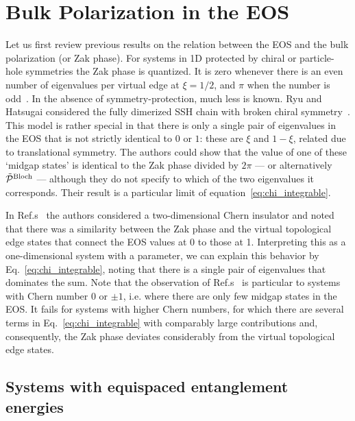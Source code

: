 \documentclass[twocolumn,amsmath,longbibliography,amssymb,superscriptaddress]{revtex4-1}
\begin{document}
\section{Bulk Polarization in the EOS}\label{sec:bulkpolarization}

Let us first review previous results on the relation between the EOS and the bulk polarization (or Zak phase). 
For systems in 1D protected by chiral or particle-hole symmetries the Zak phase is quantized. It is zero whenever there is an even number  of eigenvalues per virtual edge at $\xi = 1/2$, and $\pi$ when the number is odd~\cite{Asboth2016}. 
In the absence of symmetry-protection, much less is known. 
Ryu and Hatsugai considered the fully dimerized SSH chain with broken chiral symmetry~\cite{Ryu2006}.  
This model is rather special in that there is only a single pair of eigenvalues in the EOS that is not strictly identical to $0$ or $1$: these are $\xi$ and $1-\xi$, related due to translational symmetry. 
The authors could show that the value of one of these `midgap states' is identical to the Zak phase divided by $2\pi$ --- or alternatively $\tilde{\mathcal{P}}^{\rm Bloch}$ --- although they do not specify to which of the two eigenvalues it corresponds. 
Their result is a particular limit of equation~\eqref{eq:chi_integrable}. 
%

In Ref.s~\cite{Huang2012,Huang2012-2} the authors considered a two-dimensional Chern insulator and noted that there was a similarity between the Zak phase and the virtual topological edge states that connect the EOS values at 0 to those at 1. 
Interpreting this as a one-dimensional system with a parameter, we can explain this behavior by Eq.~\eqref{eq:chi_integrable}, noting that there is a single pair of eigenvalues that dominates the sum. 
Note that the observation of Ref.s~\cite{Huang2012,Huang2012-2} is  particular to systems with Chern number 0 or $\pm 1$, i.e. where there are only few midgap states in the EOS. 
It fails for systems with higher Chern numbers,  for which there are several terms in Eq.~\eqref{eq:chi_integrable} with comparably large contributions and, consequently, the Zak phase deviates considerably from the virtual topological edge states.


\subsection{Systems with equispaced entanglement energies}
\end{document}
